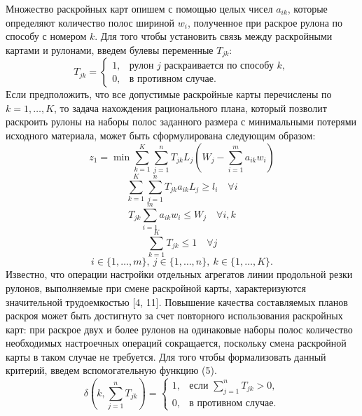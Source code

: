 \documentclass[12pt]{article}
\begin{document}
Множество раскройных карт опишем с помощью целых чисел $a_{ik}$, которые 
определяют количество полос шириной $w_i$, полученное при раскрое рулона по 
способу с номером $k$. Для того чтобы установить связь между раскройными 
картами и рулонами, введем булевы переменные $T_{jk}$:
\[ T_{jk}=\begin{cases}
             1, & \text{рулон } j \text{ раскраивается по способу } k, \\
             0, & \text{в противном случае}.
          \end{cases} \]
Если предположить, что все допустимые раскройные карты перечислены по 
$k=1,\ldots,K$, то задача нахождения рационального плана, который позволит 
раскроить рулоны на наборы полос заданного размера с минимальными потерями 
исходного материала, может быть сформулирована следующим образом:
\begin{equation}
    z_1=\min{\sum_{k=1}^{K} \sum_{j=1}^{n} T_{jk} L_j 
        \left(W_j-\sum_{i=1}^{m} a_{ik}w_i\right)}
\end{equation}
\begin{equation}
     \sum_{k=1}^{K} \sum_{j=1}^{n} T_{jk} a_{ik} L_j \geq l_i \quad \forall i
\end{equation}
\begin{equation}
     T_{jk} \sum_{i=1}^{m} a_{ik} w_i \leq W_j \quad \forall i,k
\end{equation}
\begin{equation}
     \sum_{k=1}^{K} T_{jk} \leq 1 \quad \forall j
\end{equation}
\[ i \in \{1,\ldots,m\}, \: j \in \{1,\ldots,n\}, \: k \in \{1,\ldots,K\}.\]
Известно, что операции настройки отдельных агрегатов линии продольной резки 
рулонов, выполняемые при смене раскройной карты, характеризуются значительной 
трудоемкостью [4, 11]. Повышение качества составляемых планов раскроя может 
быть достигнуто за счет повторного использования раскройных карт: при раскрое 
двух и более рулонов на одинаковые наборы полос количество необходимых 
настроечных операций сокращается, поскольку смена раскройной карты в таком 
случае не требуется. Для того чтобы формализовать данный критерий, введем 
вспомогательную функцию (5).
\begin{equation}
    \delta\left(k, \sum_{j=1}^{n} T_{jk}\right)=
        \begin{cases}
            1, & \text{если } \sum_{j=1}^{n} T_{jk}>0, \\
            0, & \text{в противном случае}.
        \end{cases}    
\end{equation}
\end{document}
